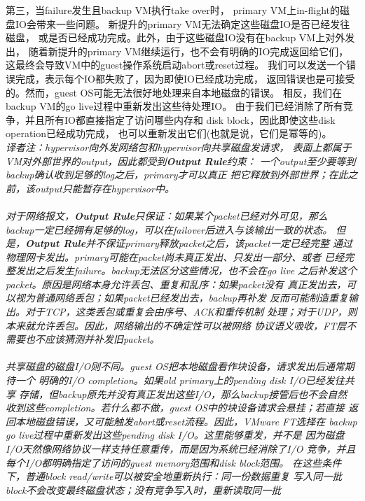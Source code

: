 第三，当failure发生且backup VM执行take over时，%
primary VM上in-flight的磁盘IO会带来一些问题。%
新提升的primary VM无法确定这些磁盘IO是否已经发往磁盘，%
或是否已经成功完成。此外，由于这些磁盘IO没有在backup VM上对外发出，%
随着新提升的primary VM继续运行，也不会有明确的IO完成返回给它们，%
这最终会导致VM中的guest操作系统启动abort或reset过程。%
我们可以发送一个错误完成，表示每个IO都失败了，因为即使IO已经成功完成，%
返回错误也是可接受的。然而，guest OS可能无法很好地处理来自本地磁盘的错误。%
相反，我们在backup VM的go live过程中重新发出这些待处理IO。%
由于我们已经消除了所有竞争，并且所有IO都直接指定了访问哪些内存和%
disk block，因此即使这些disk operation已经成功完成，%
也可以重新发出它们(也就是说，它们是幂等的)。
\\\emph{译者注：hypervisor向外发网络包和hypervisor向共享磁盘发请求，%
表面上都属于VM对外部世界的output，因此都受到\textbf{Output Rule}约束：%
一个output至少要等到backup确认收到足够的log之后，primary才可以真正%
把它释放到外部世界；在此之前，该output只能暂存在hypervisor中。%
\\\\对于网络报文，\textbf{Output Rule}只保证：如果某个packet已经对外可见，那么%
backup一定已经拥有足够的log，可以在failover后进入与该输出一致的状态。%
但是，\textbf{Output Rule}并不保证primary释放packet之后，该packet一定已经完整%
通过物理网卡发出。primary可能在packet尚未真正发出、只发出一部分、或者%
已经完整发出之后发生failure。backup无法区分这些情况，也不会在go live%
之后补发这个packet。原因是网络本身允许丢包、重复和乱序：如果packet没有%
真正发出去，可以视为普通网络丢包；如果packet已经发出去，backup再补发%
反而可能制造重复输出。对于TCP，这类丢包或重复会由序号、ACK和重传机制%
处理；对于UDP，则本来就允许丢包。因此，网络输出的不确定性可以被网络%
协议语义吸收，FT层不需要也不应该猜测并补发旧packet。%
\\\\共享磁盘的磁盘I/O则不同。guest OS把本地磁盘看作块设备，请求发出后通常期待一个%
明确的I/O completion。如果old primary上的pending disk I/O已经发往共享%
存储，但backup原先并没有真正发出这些I/O，那么backup接管后也不会自然%
收到这些completion。若什么都不做，guest OS中的块设备请求会悬挂；若直接%
返回本地磁盘错误，又可能触发abort或reset流程。因此，VMware FT选择在%
backup go live过程中重新发出这些pending disk I/O。这里能够重发，并不是%
因为磁盘I/O天然像网络协议一样支持任意重传，而是因为系统已经消除了I/O%
竞争，并且每个I/O都明确指定了访问的guest memory范围和disk block范围。%
在这些条件下，普通block read/write可以被安全地重新执行：同一份数据重复%
写入同一批block不会改变最终磁盘状态；没有竞争写入时，重新读取同一批%
}
